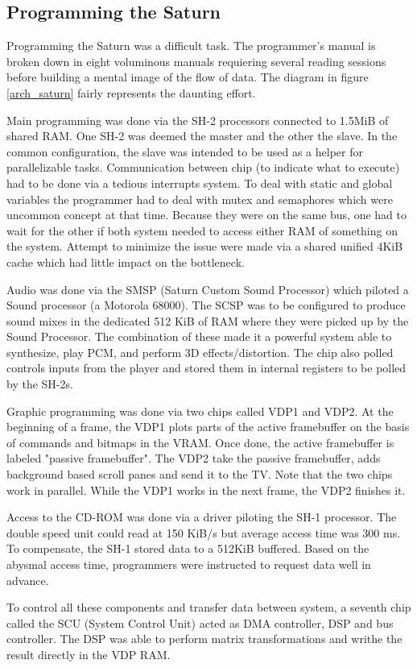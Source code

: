 \subsection{Programming the Saturn}
Programming the Saturn was a difficult task. The programmer's manual is broken down in eight voluminous manuals requiering several reading sessions before building a mental image of the flow of data. The diagram in figure \ref{arch_saturn} fairly represents the daunting effort.\\
\par
Main programming was done via the SH-2 processors connected to 1.5MiB of shared RAM. One SH-2 was deemed the master and the other the slave. In the common configuration, the slave was intended to be used as a helper for parallelizable tasks. Communication between chip (to indicate what to execute) had to be done via a tedious interrupts system. To deal with static and global variables the programmer had to deal with mutex and semaphores which were uncommon concept at that time. Because they were on the same bus, one had to wait for the other if both system needed to access either RAM of something on the system. Attempt to minimize the issue were made via a shared unified 4KiB cache which had little impact on the bottleneck.\\
\par
Audio was done via the SMSP (Saturn Custom Sound Processor) which piloted a Sound processor (a Motorola 68000). The SCSP was to be configured to produce sound mixes in the dedicated 512 KiB of RAM where they were picked up by the Sound Processor. The combination of these made it a powerful system able to synthesize, play PCM, and perform 3D effects/distortion. The chip also polled controls inputs from the player and stored them in internal registers to be polled by the SH-2s.\\
\par
Graphic programming was done via two chips called VDP1 and VDP2. At the beginning of a frame, the VDP1 plots parts of the active framebuffer on the basis of commands and bitmaps in the VRAM. Once done, the active framebuffer is labeled "passive framebuffer". The VDP2 take the passive framebuffer, adds background based scroll panes and send it to the TV. Note that the two chips work in parallel. While the VDP1 works in the next frame, the VDP2 finishes it.\\
\par
Access to the CD-ROM was done via a driver piloting the SH-1 processor. The double speed unit could read at 150 KiB/s but average access time was 300 ms. To compensate, the SH-1 stored data to a 512KiB buffered. Based on the abysmal access time, programmers were instructed to request data well in advance.\\ 
\par
To control all these components and transfer data between system, a seventh chip called the SCU (System Control Unit) acted as DMA controller, DSP and bus controller. The DSP was able to perform matrix transformations and writhe the result directly in the VDP RAM.\\
\par


